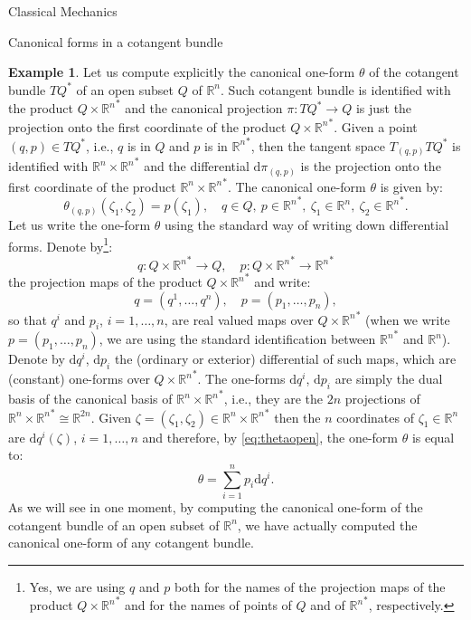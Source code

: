 \documentclass[oneside,a4paper,11pt]{amsbook}
\newcommand{\R}{\mathds R}
\newcommand{\dd}{\mathrm d}
\theoremstyle{remark}\newtheorem{exercise}{Exercise}[chapter]
\theoremstyle{plain}\newtheorem{teo}{Theorem}[section]
\theoremstyle{plain}\newtheorem{lem}[teo]{Lemma}
\theoremstyle{plain}\newtheorem{prop}[teo]{Proposition}
\theoremstyle{plain}\newtheorem{cor}[teo]{Corollary}
\theoremstyle{definition}\newtheorem{defin}[teo]{Definition}
\theoremstyle{remark}\newtheorem{rem}[teo]{Remark}
\theoremstyle{definition}\newtheorem{notation}[teo]{Notation}
\theoremstyle{definition}\newtheorem{convention}[teo]{Convention}
\theoremstyle{definition}\newtheorem{example}[teo]{Example}
\numberwithin{section}{chapter}
\numberwithin{equation}{section}
\begin{document}
\begin{chapter}{Classical Mechanics}
\begin{section}{Canonical forms in a cotangent bundle}
\begin{example}\label{exa:thetaopen}
Let us compute explicitly the canonical one-form $\theta$ of the cotangent bundle $TQ^*$ of an open subset $Q$ of $\R^n$. Such cotangent bundle is
identified with the product $Q\times{\R^n}^*$ and the canonical projection $\pi:TQ^*\to Q$ is just the projection onto the first coordinate
of the product $Q\times{\R^n}^*$. Given
a point $(q,p)\in TQ^*$, i.e., $q$ is in $Q$ and $p$ is in ${\R^n}^*$, then the tangent space $T_{(q,p)}TQ^*$ is identified with $\R^n\times{\R^n}^*$ and
the differential $\dd\pi_{(q,p)}$ is the projection onto the first coordinate of the product $\R^n\times{\R^n}^*$. The canonical one-form $\theta$ is given by:
\begin{equation}\label{eq:thetaopen}
\theta_{(q,p)}(\zeta_1,\zeta_2)=p(\zeta_1),\quad q\in Q,\ p\in{\R^n}^*,\ \zeta_1\in\R^n,\ \zeta_2\in{\R^n}^*.
\end{equation}
Let us write the one-form $\theta$ using the standard way of writing down differential forms. Denote by\footnote{%
Yes, we are using $q$ and $p$ both for the names of the projection maps of the product $Q\times{\R^n}^*$
and for the names of points of $Q$ and of ${\R^n}^*$, respectively.}:
\[q:Q\times{\R^n}^*\longrightarrow Q,\quad p:Q\times{\R^n}^*\longrightarrow{\R^n}^*\]
the projection maps of the product $Q\times{\R^n}^*$ and write:
\[q=(q^1,\ldots,q^n),\quad p=(p_1,\ldots,p_n),\]
so that $q^i$ and $p_i$, $i=1,\ldots,n$, are real valued maps
over $Q\times{\R^n}^*$ (when we write $p=(p_1,\ldots,p_n)$, we are using the standard identification between ${\R^n}^*$ and $\R^n$).
Denote by $\dd q^i$, $\dd p_i$ the (ordinary or exterior) differential of such maps, which are (constant) one-forms
over $Q\times{\R^n}^*$. The one-forms $\dd q^i$, $\dd p_i$ are simply the dual basis of the canonical basis of $\R^n\times{\R^n}^*$, i.e., they
are the $2n$ projections of $\R^n\times{\R^n}^*\cong\R^{2n}$.
Given $\zeta=(\zeta_1,\zeta_2)\in\R^n\times{\R^n}^*$ then the $n$ coordinates of $\zeta_1\in\R^n$ are $\dd q^i(\zeta)$, $i=1,\ldots,n$ and therefore,
by \eqref{eq:thetaopen}, the one-form $\theta$ is equal to:
\begin{equation}\label{eq:thetapdq}
\theta=\sum_{i=1}^np_i\dd q^i.
\end{equation}
As we will see in one moment, by computing the canonical one-form of the cotangent bundle of an open subset of $\R^n$, we have
actually computed the canonical one-form of any cotangent bundle.
\end{example}


\end{section}
\end{chapter}
\end{document}

